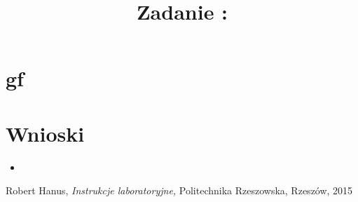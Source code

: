 \documentclass{classrep}
\author{
  \studentinfo{Witold Olechowski}{127517} \and
  \studentinfo{Grzegorz Pelczar}{125242} \and
  \studentinfo{Tomasz Marecik}{127374} 
}
\title{Zadanie : }
\begin{document}
\maketitle

\section{gf}

\section{Wnioski}
\begin{itemize}
	\item 
\end{itemize}

\begin{thebibliography}{0}
   Robert Hanus,
    \textsl{Instrukcje laboratoryjne,} Politechnika Rzeszowska, Rzeszów, 2015
\end{thebibliography}
\end{document}
